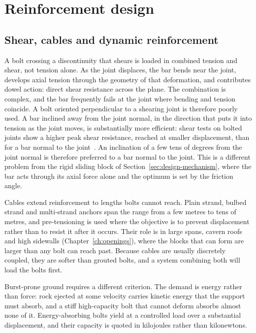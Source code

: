 \section{Reinforcement design}
\label{sec:reinforcement-design}

\subsection{Shear, cables and dynamic reinforcement}
\label{sec:shear-cables-dynamic}

A bolt crossing a discontinuity that shears is loaded in combined tension and
shear, not tension alone. As the joint displaces, the bar bends near the
joint, develops axial tension through the geometry of that deformation, and
contributes dowel action: direct shear resistance across the plane. The
combination is complex, and the bar frequently fails at the joint where
bending and tension coincide. A bolt oriented perpendicular to a shearing
joint is therefore poorly used. A bar inclined away from the
joint normal, in the direction that puts it into tension as the joint moves,
is substantially more efficient: shear tests on bolted joints show a higher
peak shear resistance, reached at smaller displacement, than for a bar normal
to the joint~\citep{spang1990action}. An inclination of a few tens of
degrees from the joint normal is therefore preferred to a bar normal to the
joint. This is a different problem
from the rigid sliding block of Section~\ref{sec:design-mechanism}, where the
bar acts through its axial force alone and the optimum is set by the friction
angle.

Cables extend reinforcement to lengths bolts cannot reach. Plain strand,
bulbed strand and multi-strand anchors span the range from a few metres to
tens of metres, and pre-tensioning is used where the objective is to prevent
displacement rather than to resist it after it occurs. Their role is in large
spans, cavern roofs and high sidewalls (Chapter~\ref{ch:openings}), where
the blocks that can form are larger than any bolt can reach past. Because
cables are usually discretely coupled, they are softer than grouted bolts, and
a system combining both will load the bolts first.

Burst-prone ground requires a different criterion. The demand is
energy rather than force: rock ejected at some velocity carries kinetic energy
that the support must absorb, and a stiff high-capacity bolt that cannot
deform absorbs almost none of it. Energy-absorbing bolts yield at a controlled
load over a substantial displacement, and their capacity is quoted in
kilojoules rather than kilonewtons.

